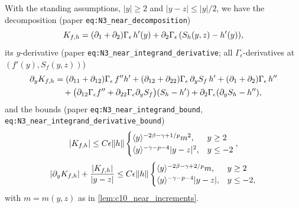 \begin{lemma}
  \label{lem:c10_N3_near_integrand}
  With the standing assumptions, $|y|\ge2$ and $|y-z|\le|y|/2$, we have the decomposition
  (paper \texttt{eq:N3\_near\_decomposition})
  \[
    K_{f,h}=(\partial_1+\partial_2)\Gamma_\epsilon\,h'(y)+\partial_2\Gamma_\epsilon\,(S_h(y,z)-h'(y)),
  \]
  its $y$-derivative (paper \texttt{eq:N3\_near\_integrand\_derivative}; all $\Gamma_\epsilon$-derivatives at
  $(f'(y),S_f(y,z))$)
  \begin{align*}
    \partial_yK_{f,h}&=(\partial_{11}+\partial_{12})\Gamma_\epsilon\,f''h'+(\partial_{12}+\partial_{22})\Gamma_\epsilon\,\partial_yS_f\,h'
    +(\partial_1+\partial_2)\Gamma_\epsilon\,h''\\
    &\quad+\bigl(\partial_{12}\Gamma_\epsilon f''+\partial_{22}\Gamma_\epsilon\partial_yS_f\bigr)(S_h-h')
    +\partial_2\Gamma_\epsilon(\partial_yS_h-h''),
  \end{align*}
  and the bounds (paper \texttt{eq:N3\_near\_integrand\_bound}, \texttt{eq:N3\_near\_integrand\_derivative\_bound})
  \[
    |K_{f,h}|\le C\epsilon\|h\|\begin{cases}\langle y \rangle^{-2\beta-\gamma+1/p}m^2,&y\ge2\\\langle y \rangle^{-\gamma-p-4}|y-z|^2,&y\le-2\end{cases},
  \]
  \[
    |\partial_yK_{f,h}|+\frac{|K_{f,h}|}{|y-z|}\le C\epsilon\|h\|\begin{cases}\langle y \rangle^{-2\beta-\gamma+2/p}m,&y\ge2\\\langle y \rangle^{-\gamma-p-4}|y-z|,&y\le-2,\end{cases}
  \]
  with $m=m(y,z)$ as in \cref{lem:c10_near_increments}.
\end{lemma}
